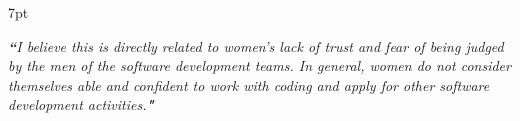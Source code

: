 \documentclass{IEEEcsmag}
\newenvironment{formal}{%
  \def\FrameCommand{%
    \hspace{1pt}%
    {\color{formalshade}\vrule width 2pt}%
    {\color{formalshade}\vrule width 4pt}%
    \colorbox{formalshade}%
  }%
  \MakeFramed{\advance\hsize-\width\FrameRestore}%
  \noindent\hspace{-4.55pt}%
  \begin{adjustwidth}{}{7pt}%
  \vspace{2pt}\vspace{2pt}%
}
{%
  \vspace{2pt}\end{adjustwidth}\endMakeFramed%
}
\begin{document}

\begin{formal}
\emph{{\bf``}I believe this is directly related to women's lack of trust and fear of being judged by the men of the software development teams. In general, women do not consider themselves able and confident to work with coding and apply for other software development activities.{\bf"}}
\end{formal}
\end{document}

